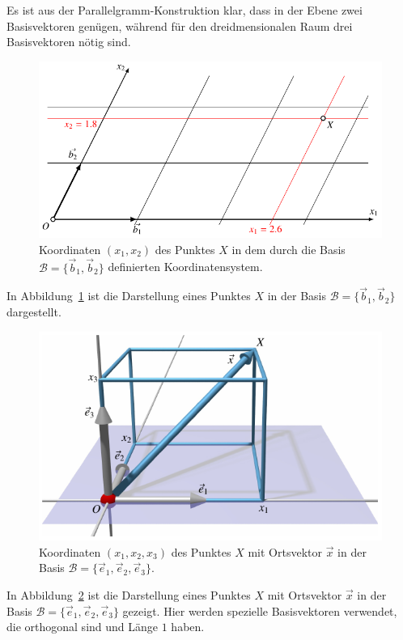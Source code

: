 Es ist aus der Parallelgramm-Konstruktion klar, dass in der Ebene zwei 
Basisvektoren genügen, während für den dreidmensionalen Raum drei
Basisvektoren nötig sind.
\begin{figure}
\centering
\includegraphics{3/images/coord2d.pdf}
\caption{Koordinaten $(x_1,x_2)$ des Punktes $X$ in dem durch die
Basis  $\mathcal{B}=\{\vec{b}_1,\vec{b}_2\}$ definierten Koordinatensystem.
\label{skript:affin:coord2d}}
\end{figure}
In Abbildung~\ref{skript:affin:coord2d} ist die Darstellung eines Punktes
$X$ in der Basis $\mathcal{B}=\{\vec{b}_1,\vec{b}_2\}$ dargestellt.
\begin{figure}
\centering
\includegraphics{3/images/coordsystem.pdf}
\caption{Koordinaten $(x_1,x_2,x_3)$ des Punktes $X$ mit Ortsvektor $\vec{x}$
in der Basis $\mathcal{B}=\{\vec{e}_1,\vec{e}_2,\vec{e}_3\}$.
\label{skript:affin:coordsystem}}
\end{figure}
In Abbildung~\ref{skript:affin:coordsystem} ist die Darstellung eines Punktes
$X$ mit Ortsvektor $\vec{x}$ in der Basis
$\mathcal{B}=\{\vec{e}_1,\vec{e}_2,\vec{e}_3\}$
gezeigt.
Hier werden spezielle Basisvektoren verwendet, die orthogonal sind und Länge
$1$ haben.

